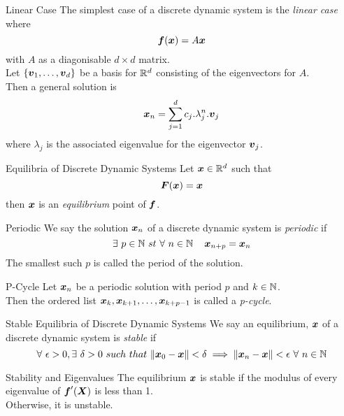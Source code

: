 \documentclass[11pt,a4paper]{article}
\begin{document}
\subtitle{Theorem 17.02 - }{Linear Case}
The simplest case of a discrete dynamic system is the \textit{linear case} where
$$\boldsymbol{f}(\boldsymbol{x}) = A\boldsymbol{x}$$
with $A$ as a diagonisable $d \times d$ matrix.\\
Let $\{\boldsymbol{v}_1, \dots , \boldsymbol{v}_d\}$ be a basis for $\mathbb{R}^d$ consisting of the eigenvectors for $A$.\\
Then a general solution is
$$\boldsymbol{x}_n = \sum_{j=1}^d c_j.\lambda_j^n.\boldsymbol{v}_j$$
where $\lambda_j$ is the associated eigenvalue for the eigenvector $\boldsymbol{v}_j$.\\

\subtitle{Definition 17.03 - }{Equilibria of Discrete Dynamic Systems}
Let $\boldsymbol{x} \in \mathbb{R}^d$ such that
$$\boldsymbol{F}(\boldsymbol{x}) = \boldsymbol{x}$$
then $\boldsymbol{x}$ is an \textit{equilibrium} point of $\boldsymbol{f}$.\\

\subtitle{Definition 17.04 - }{Periodic}
We say the solution $\boldsymbol{x}_n$ of a discrete dynamic system is \textit{periodic} if
$$\exists\ p \in \nat\ st\ \forall\ n \in \nat\,\quad \vect{x}_{n+p} = \vect{x}_n$$
The smallest such $p$ is called the period of the solution.\\

\subtitle{Definition 17.05 - }{P-Cycle}
Let $\boldsymbol{x}_n$ be a periodic solution with period $p$ and $k \in \mathbb{N}$.\\
Then the ordered list $\boldsymbol{x}_k, \boldsymbol{x}_{k+1}, \dots, \boldsymbol{x}_{k+p-1}$ is called a \textit{p-cycle}.\\

\subtitle{Definition 17.06 - }{Stable Equilibria of Discrete Dynamic Systems}
We say an equilibrium, $\boldsymbol{x}$ of a discrete dynamic system is \textit{stable} if
$$\forall\ \epsilon > 0, \exists\ \delta > 0\ such\ that\ \|\vect{x}_0 - \vect{x}\| < \delta \implies \|\vect{x}_n - \vect{x}\| < \epsilon\ \forall\ n \in \nat$$

\subtitle{Proposition 17.07 - }{Stability and Eigenvalues}
The equilibrium $\boldsymbol{x}$ is stable if the modulus of every eigenvalue of $\boldsymbol{f}'(\boldsymbol{X})$ is less than 1.\\
Otherwise, it is unstable.
\end{document}
